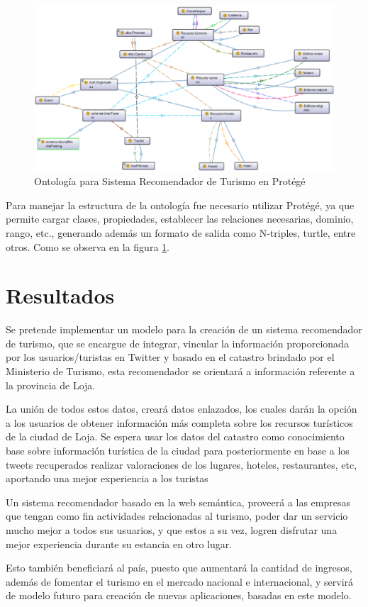 \documentclass[lnbip,sechang,a4paper]{svmultln}
\begin{document}
\begin{figure}
\centering
\includegraphics[width=13cm]{protege}
\caption{Ontología para Sistema Recomendador de Turismo en Protégé}
\label{fig:cuatro}
\end{figure}


Para manejar la estructura de la ontología fue necesario utilizar Protégé, ya que permite cargar clases, propiedades, establecer las relaciones necesarias, dominio, rango, etc., generando además un formato de salida como N-triples, turtle, entre otros. Como se observa en la figura \ref{fig:cuatro}.
\section{Resultados}

Se pretende implementar un modelo para la creación de un sistema recomendador de turismo, que se encargue de integrar, vincular la información proporcionada por los usuarios/turistas en Twitter y basado en el catastro  brindado por el Ministerio de Turismo, esta recomendador se orientará a información referente a la provincia de Loja.

La unión de todos estos datos, creará datos enlazados, los cuales darán la opción a los usuarios de obtener información más completa sobre los recursos turísticos de la ciudad de Loja. Se espera usar los datos del catastro como conocimiento base sobre información turística de la ciudad para posteriormente en base  a los tweets recuperados realizar valoraciones de los lugares, hoteles, restaurantes, etc, aportando una mejor experiencia a los turistas

Un sistema recomendador basado en la web semántica, proveerá a las empresas que tengan como fin actividades relacionadas al turismo, poder dar un servicio mucho mejor a todos sus usuarios, y que estos a su vez, logren disfrutar una mejor experiencia durante su estancia en otro lugar.

Esto también beneficiará al país, puesto que aumentará la cantidad de ingresos, además de fomentar el turismo en el mercado nacional e internacional, y servirá de modelo futuro para creación de nuevas aplicaciones, basadas en este modelo.

%
{}

%
\end{document}
